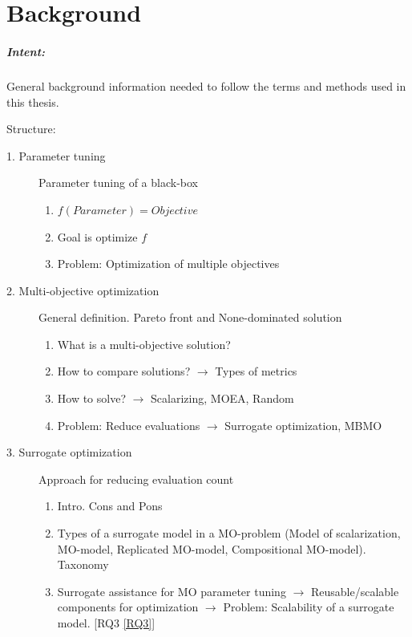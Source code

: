 \chapter{Background}\label{sec:background}

    \begin{blockquote}
        \paragraph{Intent:} General background information needed to follow the terms and methods used in this thesis. 
                
        Structure:
        \begin{description}
            \item[1. Parameter tuning] Parameter tuning of a black-box
                \begin{enumerate}
                    \item $f(Parameter) = Objective$ 
                    \item Goal is optimize $f$
                    \item Problem: Optimization of multiple objectives
                \end{enumerate}
            \item[2. Multi-objective optimization] General definition. Pareto front and None-dominated solution
                \begin{enumerate}
                    \item What is a multi-objective solution?
                    \item How to compare solutions? $\rightarrow$ Types of metrics
                    \item How to solve? $\rightarrow$ Scalarizing, MOEA, Random
                    \item Problem: Reduce evaluations $\rightarrow$ Surrogate optimization, MBMO
                \end{enumerate}
            \item[3. Surrogate optimization] Approach for reducing evaluation count
                \begin{enumerate}
                    \item Intro. Cons and Pons
                    \item Types of a surrogate model in a MO-problem (Model of scalarization, MO-model, Replicated MO-model, Compositional MO-model). Taxonomy
                    \item Surrogate assistance for MO parameter tuning $\rightarrow$ Reusable/scalable components for optimization $\rightarrow$ Problem: Scalability of a surrogate model. [RQ3 \ref{RQ3}]                   

\end{enumerate}
\end{description}
\end{blockquote}
